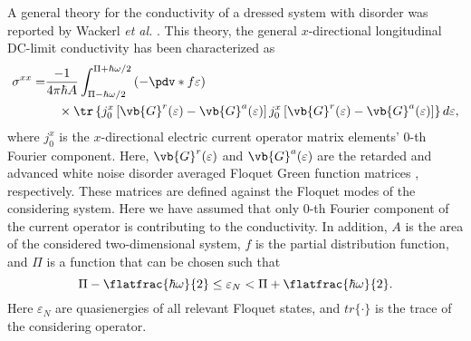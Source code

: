 
A general theory for the conductivity of a dressed system with disorder was reported by Wackerl \textit{et al.} \cite{wackerl20,wackerlthesis20}. This theory, the general $x$-directional longitudinal DC-limit conductivity has been characterized as
\begin{equation} \label{eq:22}
  \begin{aligned}
    \sigma^{xx} = &
    \frac{-1}{4\pi\hbar A}
    \int_{\Pi-\hbar\omega/2}^{\Pi+ \hbar\omega/2}
    \left(
    -\pdv*{f}{\varepsilon }\right) \\
    &  \quad\times
    \tr
    \left\{
    {j}^x_0
    \left[
    \vb{G}^{r} (\varepsilon) - \vb{G}^{a} (\varepsilon)
    \right]
    {j}^x_0
    \left[
    \vb{G}^{r} (\varepsilon) - \vb{G}^{a} (\varepsilon)
    \right]
    \right\} d\varepsilon,
  \end{aligned}
\end{equation}
where $j^x_0$ is the $x$-directional electric current operator matrix elements' $0$-th Fourier component. Here, $\vb{G}^{r}(\varepsilon)$ and $\vb{G}^{a} (\varepsilon)$ are the retarded and advanced white noise disorder averaged Floquet Green function matrices \cite{wackerl20,wackerlthesis20}, respectively. These matrices are defined against the Floquet modes of the considering system. Here we have assumed that only $0$-th Fourier component of the current operator is contributing to the conductivity. In addition, $A$ is the area of the considered two-dimensional system, $f$ is the partial distribution function, and $\Pi$ is a function that can be chosen such that
\begin{equation} \label{eq:23}
    \Pi- \flatfrac{\hbar \omega}{2}
    \leq \varepsilon_N
    <
    \Pi + \flatfrac{\hbar \omega}{2}.
\end{equation}
Here $ \varepsilon_N$ are quasienergies of all relevant Floquet states, and $tr\{\cdot\}$ is the trace of the considering operator.

